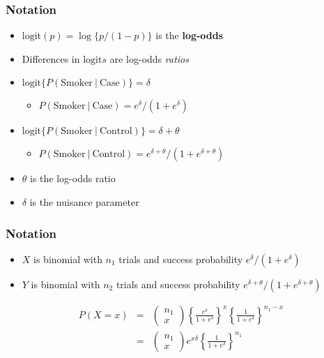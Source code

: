 \documentclass[aspectratio=169]{beamer}
\newcommand{\logit}{\mathrm{logit}}
\begin{document}
\begin{frame}\frametitle{Notation}
\begin{itemize}
\item $\logit(p) = \log\{p / (1 - p)\}$ is the {\bf log-odds}
\item Differences in $\logit s$ are log-odds {\em ratios}
\item $\logit\{P(\mbox{Smoker} ~|~ \mbox{Case})\} = \delta$
  \begin{itemize}
  \item   $P(\mbox{Smoker} ~|~ \mbox{Case}) = e^\delta /(1 + e^\delta)$ 
  \end{itemize}
\item $\logit\{P(\mbox{Smoker} ~|~ \mbox{Control})\} = \delta + \theta$
  \begin{itemize}
  \item  $P(\mbox{Smoker} ~|~ \mbox{Control}) = e^{\delta + \theta} / (1 + e^{\delta+\theta})$   \end{itemize}
\item $\theta$ is the log-odds ratio
\item $\delta$ is the nuisance parameter
\end{itemize}
\end{frame}

\begin{frame}\frametitle{Notation}
\begin{itemize}
\item $X$ is binomial with $n_1$ trials and success probability $e^\delta /(1 + e^\delta)$
\item $Y$ is binomial with $n_2$ trials and success probability $e^{\delta + \theta} / (1 + e^{\delta+\theta})$
\end{itemize}
\begin{eqnarray*}
P(X = x) & = &
\left(\begin{array}{c} n_1 \\ x \end{array}\right)\left\{\frac{e^\delta}{1 + e^\delta}\right\}^x
\left\{\frac{1}{1 + e^\delta}\right\}^{n_1-x} \\
& = & \left(\begin{array}{c} n_1 \\ x \end{array}\right)e^{x\delta}
\left\{\frac{1}{1 + e^\delta}\right\}^{n_1}
\end{eqnarray*}
\end{frame}
\end{document}
